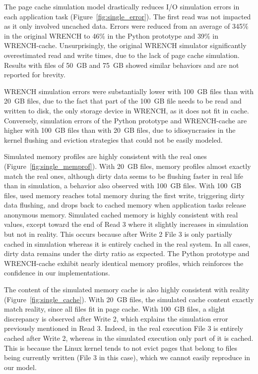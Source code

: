 \documentclass[conference]{IEEEtran}
\newcommand{\wrench}{WRENCH\xspace}
\begin{document}

        The page cache simulation model drastically reduces I/O simulation
        errors in each application task (Figure~\ref{fig:single_error}). The first read was not impacted
        as it only involved uncached data. Errors were reduced from an average
        of 345\% in the original \wrench to 46\% in the Python prototype and
        39\% in \wrench-cache. Unsurprisingly, the original \wrench simulator
        significantly overestimated read and write times, due to the lack
        of page cache simulation. Results with files of 50~GB and 75~GB
        showed similar behaviors and are not reported for brevity.

        \wrench simulation errors were substantially lower with 100~GB
        files than with 20~GB files, due to the fact that part of the
        100~GB file needs to be read and written to disk, the only storage
        device in \wrench, as it does not fit in cache. Conversely,
        simulation errors of the Python prototype and \wrench-cache are higher with
        100~GB files than with 20~GB files, due to idiosyncrasies in the kernel
        flushing and eviction strategies that could not be easily modeled.

        Simulated memory profiles are highly consistent with the real ones
        (Figure~\ref{fig:single_memprof}). With 20~GB files, memory profiles almost exactly match the
        real ones, although dirty data seems to be flushing faster in real
        life than in simulation, a behavior also
        observed with 100~GB files. With 100~GB files, used memory reaches
        total memory during the first write, triggering dirty data
        flushing, and drops back to cached memory when application tasks
        release anonymous memory. Simulated cached memory is highly
        consistent with real values, except toward the end of Read 3 where
        it slightly increases in simulation but not in reality. This
        occurs because after Write 2 File 3 is only partially
        cached in simulation whereas it is entirely cached in the real
        system. In all cases, dirty data remains under the dirty ratio as
        expected. The Python prototype and \wrench-cache exhibit nearly
        identical memory profiles, which reinforces the confidence in our
        implementations.

        The content of the simulated memory cache is also highly
        consistent with reality (Figure~\ref{fig:single_cache}). With 20~GB
        files, the simulated cache content exactly match reality, since
        all files fit in page cache. With 100~GB files, a slight
        discrepancy is observed after Write 2, which explains the
        simulation error previously mentioned in Read 3. Indeed, in the real
        execution File 3 is entirely cached after Write 2, whereas
        in the simulated execution only part of it is cached. This is because
        the Linux kernel tends to not evict pages that
        belong to files being currently written (File 3 in this case),
        which we cannot easily reproduce in our model.
\end{document}
